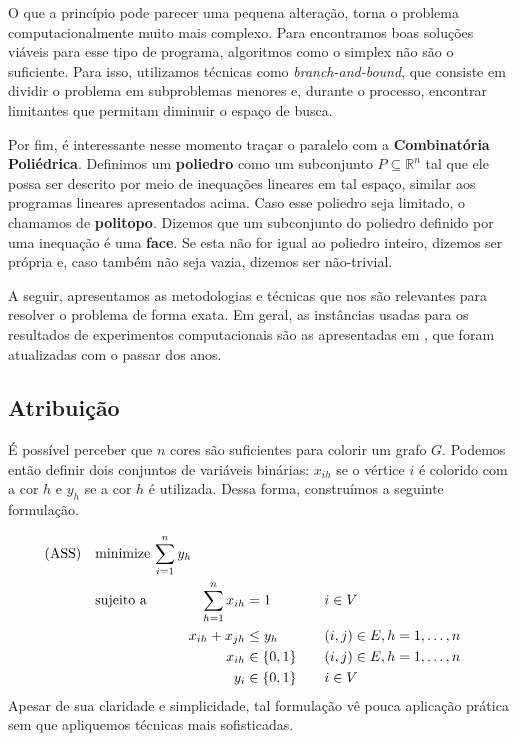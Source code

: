 \documentclass[11pt]{article}
\begin{document}
O que a princípio pode parecer uma pequena alteração, torna o problema computacionalmente muito mais complexo.
Para encontramos boas soluções viáveis para esse tipo de programa, algoritmos como o simplex não são o suficiente.
Para isso, utilizamos técnicas como \emph{branch-and-bound}, que consiste em dividir o problema em subproblemas menores e, durante o processo, encontrar limitantes que permitam diminuir o espaço de busca.

Por fim, é interessante nesse momento traçar o paralelo com a \textbf{Combinatória Poliédrica}.
Definimos um \textbf{poliedro} como um subconjunto \(P \subseteq \mathbb{R}^n\) tal que ele possa ser descrito por meio de inequações lineares em tal espaço, similar aos programas lineares apresentados acima.
Caso esse poliedro seja limitado, o chamamos de \textbf{politopo}.
Dizemos que um subconjunto do poliedro definido por uma inequação é uma \textbf{face}.
Se esta não for igual ao poliedro inteiro, dizemos ser própria e, caso também não seja vazia, dizemos ser não-trivial.

A seguir, apresentamos as metodologias e técnicas que nos são relevantes para resolver o problema de forma exata.
Em geral, as instâncias usadas para os resultados de experimentos computacionais são as apresentadas em \autocite{GraphColoringInstances}, que foram atualizadas com o passar dos anos.

\subsection{Atribuição}
\label{sec:orga7efa9e}
É possível perceber que \(n\) cores são suficientes para colorir um grafo \(G\). Podemos então definir dois conjuntos de variáveis binárias: \(x_{ih}\) se o vértice \(i\) é colorido com a cor \(h\) e \(y_h\) se a cor \(h\) é utilizada. Dessa forma, construímos a seguinte formulação.

\begin{alignat*}{4}
\label{ass}
\mathrm{(ASS)} \quad & \omit\rlap{minimize  $\displaystyle \sum_{i=1}^n y_h$} \\
& \mbox{sujeito a}&& \quad & \sum_{h=1}^n x_{ih}&= 1        & \quad & i \in V \\
&                 &&   & x_{ih} + x_{jh}    & \leq y_h &   & (i,j) \in E, h=1,\dots,n \\
&                 &&   & x_{ih}    & \in \{0,1\} &   & (i,j) \in E, h=1,\dots,n\\
&                 &&   & y_i       & \in \{0,1\} &   & i \in V
\end{alignat*}
Apesar de sua claridade e simplicidade, tal formulação vê pouca aplicação prática sem que apliquemos técnicas mais sofisticadas.
\end{document}
